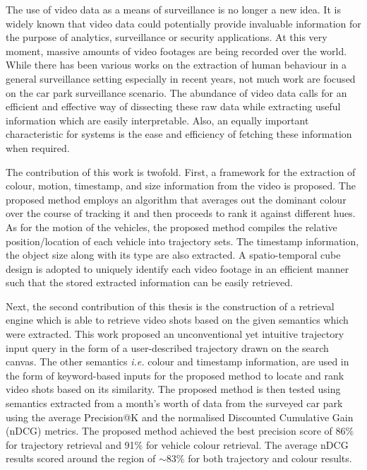 
The use of video data as a means of surveillance is no longer a new idea. It is widely known that video data could potentially provide invaluable information for the purpose of analytics, surveillance or security applications. At this very moment, massive amounts of video footages are being recorded over the world. While there has been various works on the extraction of human behaviour in a general surveillance setting especially in recent years, not much work are focused on the car park surveillance scenario. The abundance of video data calls for an efficient and effective way of dissecting these raw data while extracting useful information which are easily interpretable. Also, an equally important characteristic for systems is the ease and efficiency of fetching these information when required. 

The contribution of this work is twofold. First, a framework for the extraction of colour, motion, timestamp, and size information from the video is proposed. 
The proposed method employs an algorithm that averages out the dominant colour over the course of tracking it and then proceeds to rank it against different hues. 
As for the motion of the vehicles, the proposed method compiles the relative position/location of each vehicle into trajectory sets. The timestamp information, the object size along with its type are also extracted. A spatio-temporal cube design is adopted to uniquely identify each video footage in an efficient manner such that the stored extracted information can be easily retrieved. %

Next, the second contribution of this thesis is the construction of a retrieval engine which is able to retrieve video shots based on the given semantics which were extracted. This work proposed an unconventional yet intuitive trajectory input query in the form of a user-described trajectory drawn on the search canvas. 
The other semantics \emph{i.e.} colour and timestamp information, are used in the form of keyword-based inputs for the proposed method to locate and rank video shots based on its similarity. 
The proposed method is then tested using semantics extracted from a month's worth of data from the surveyed car park 
using the average Precision@K and the normalised Discounted Cumulative Gain (nDCG) metrics. The proposed method achieved the best precision score of 86\% for trajectory retrieval and 91\% for vehicle colour retrieval. %
The average nDCG results scored around the region of $\sim$83\% for both trajectory and colour results. 


